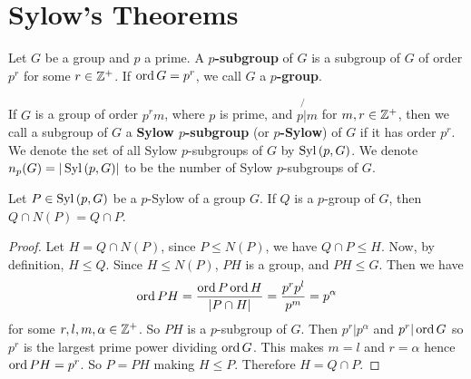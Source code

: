 \section{Sylow's Theorems}
\label{section_4.5}

\begin{definition}
  Let $G$ be a group and $p$ a prime. A  \textbf{$p$-subgroup} of $G$ is a
  subgroup of $G$ of order  $p^r$ for some $r \in \mathbb{Z}^+$. If $\operatorname{ord}{G}=p^r$, we
  call  $G$ a  \textbf{$p$-group}.
\end{definition}

\begin{definition}
  If $G$ is a group of order  $p^rm$, where  $p$ is prime, and  $p \not{|} m$
  for  $m,r \in \mathbb{Z}^+$, then we call a subgroup of $G$ a \textbf{Sylow
  $p$-subgroup} (or \textbf{$p$-Sylow}) of $G$ if it has order $p^r$. We
  denote the set of all Sylow $p$-subgroups of $G$ by  $\operatorname{Syl}{(p,G)}$. We
  denote $n_p(G)=|\operatorname{Syl}{(p,G)}|$ to be the number of Sylow $p$-subgroups of
  $G$.
\end{definition}

\begin{lemma}\label{lemma_4.5.1}
  Let $P \in \operatorname{Syl}{(p,G)}$ be a $p$-Sylow of a group  $G$. If  $Q$ is a
  $p$-group of  $G$, then  $Q \cap N(P)=Q \cap P$.
\end{lemma}
\begin{proof}
  Let $H=Q \cap N(P)$, since $P \leq N(P)$, we have $Q \cap P \leq H$. Now, by
  definition, $H \leq Q$. Since $H \leq N(P)$, $PH$ is a group, and  $PH \leq
  G$. Then we have
  \begin{equation*}
    \operatorname{ord}{PH}=\frac{\operatorname{ord}{P}\operatorname{ord}{H}}{|P \cap H|}=\frac{p^rp^l}{p^m}=p^\alpha
  \end{equation*}
  for some $r,l,m,\alpha \in \mathbb{Z}^+$. So $PH$ is a  $p$-subgroup of  $G$. Then
  $p^r|p^\alpha$ and  $p^r|\operatorname{ord}{G}$ so $p^r$ is the largest prime power
  dividing  $\operatorname{ord}{G}$. This makes $m=l$ and $r=\alpha$ hence $\operatorname{ord}{PH}=p^r$.
  So $P=PH$ making $H \leq P$. Therefore $H=Q \cap P$.
\end{proof}

